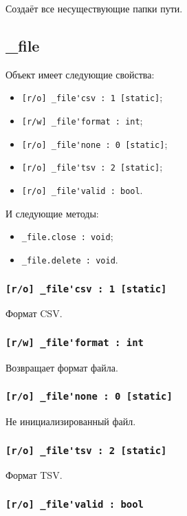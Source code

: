 \documentclass[a4paper, 14pt]{extarticle}
\newenvironment{icItems}
	{ \begin{itemize} [noitemsep,nolistsep] }
	{ \end{itemize} }
\begin{document}
Создаёт все несуществующие папки пути.

\subsection{{\color{orange} \_file}}

Объект \file{} имеет следующие свойства:
\begin{icItems}
	\item \lstinline|[r/o] _file'csv : 1 [static]|;
	\item \lstinline|[r/w] _file'format : int|;
	\item \lstinline|[r/o] _file'none : 0 [static]|;
	\item \lstinline|[r/o] _file'tsv : 2 [static]|;
	\item \lstinline|[r/o] _file'valid : bool|.
\end{icItems}

И следующие методы:
\begin{icItems}
	\item \lstinline|_file.close : void|;
	\item \lstinline|_file.delete : void|.
\end{icItems}

\subsubsection{\lstinline|[r/o] _file'csv : 1 [static]|}

Формат CSV.

\subsubsection{\lstinline|[r/w] _file'format : int|}

Возвращает формат файла.

\subsubsection{\lstinline|[r/o] _file'none : 0 [static]|}

Не инициализированный файл.

\subsubsection{\lstinline|[r/o] _file'tsv : 2 [static]|}

Формат TSV.

\subsubsection{\lstinline|[r/o] _file'valid : bool|}
\end{document}
